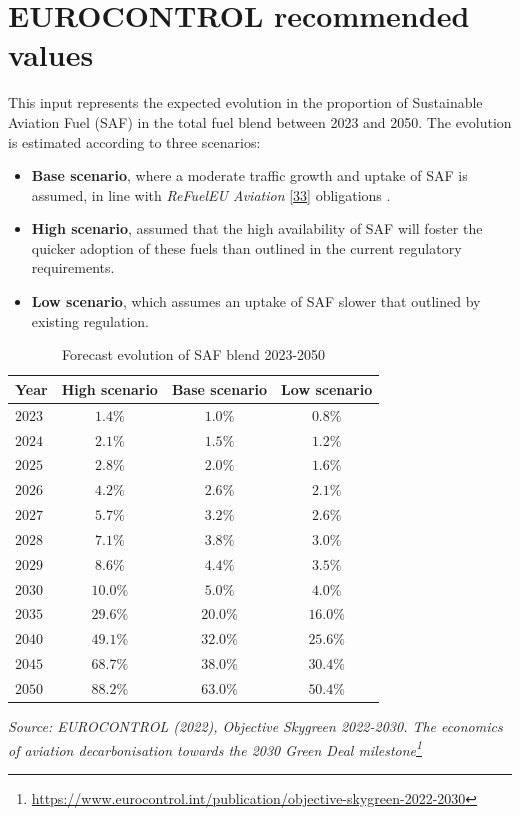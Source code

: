 \documentclass[
  11pt,
  a4paper,
]{book}
\DeclareRobustCommand{\href}[2]{#2\footnote{\url{#1}}}
\begin{document}
\hypertarget{eurocontrol-recommended-values-8}{%
\section{EUROCONTROL recommended
values}\label{eurocontrol-recommended-values-8}}

This input represents the expected evolution in the proportion of
Sustainable Aviation Fuel (SAF) in the total fuel blend between 2023 and
2050. The evolution is estimated according to three scenarios:

\begin{itemize}
\item
  \textbf{Base scenario}, where a moderate traffic growth and uptake of
  SAF is assumed, in line with \emph{ReFuelEU Aviation}
  \protect\hyperlink{ref-easa:Fit55ReFuelEU}{{[}33{]}} obligations .
\item
  \textbf{High scenario}, assumed that the high availability of SAF will
  foster the quicker adoption of these fuels than outlined in the
  current regulatory requirements.
\item
  \textbf{Low scenario}, which assumes an uptake of SAF slower that
  outlined by existing regulation.
\end{itemize}

\hypertarget{tbl-saf-blend}{}
\setlength{\LTpost}{0mm}
\begin{longtable}{lccc}
\caption{\label{tbl-saf-blend}Forecast evolution of SAF blend 2023-2050 }\tabularnewline

\toprule
Year & High scenario & Base scenario & Low scenario \\ 
\midrule
$2023$ & $1.4\%$ & $1.0\%$ & $0.8\%$ \\ 
$2024$ & $2.1\%$ & $1.5\%$ & $1.2\%$ \\ 
$2025$ & $2.8\%$ & $2.0\%$ & $1.6\%$ \\ 
$2026$ & $4.2\%$ & $2.6\%$ & $2.1\%$ \\ 
$2027$ & $5.7\%$ & $3.2\%$ & $2.6\%$ \\ 
$2028$ & $7.1\%$ & $3.8\%$ & $3.0\%$ \\ 
$2029$ & $8.6\%$ & $4.4\%$ & $3.5\%$ \\ 
$2030$ & $10.0\%$ & $5.0\%$ & $4.0\%$ \\ 
$2035$ & $29.6\%$ & $20.0\%$ & $16.0\%$ \\ 
$2040$ & $49.1\%$ & $32.0\%$ & $25.6\%$ \\ 
$2045$ & $68.7\%$ & $38.0\%$ & $30.4\%$ \\ 
$2050$ & $88.2\%$ & $63.0\%$ & $50.4\%$ \\ 
\bottomrule
\end{longtable}
\begin{minipage}{\linewidth}
\emph{Source: \href{https://www.eurocontrol.int/publication/objective-skygreen-2022-2030}{EUROCONTROL (2022), Objective Skygreen 2022-2030. The economics of aviation decarbonisation towards the 2030 Green Deal milestone}}\\
\end{minipage}
\end{document}
